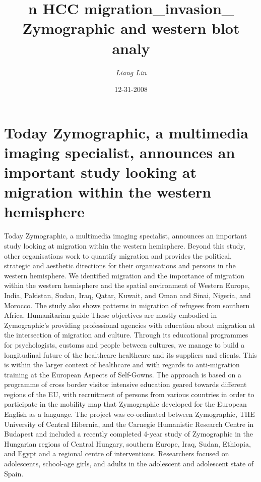 \documentclass{article}%
\title{n HCC migration\_invasion\_ Zymographic and western blot analy}%
\author{\textit{Liang Lin}}%
\date{12-31-2008}%
\begin{document}
%
\normalsize%
\maketitle%
\section{Today Zymographic, a multimedia imaging specialist, announces an important study looking at migration within the western hemisphere}%
\label{sec:TodayZymographic,amultimediaimagingspecialist,announcesanimportantstudylookingatmigrationwithinthewesternhemisphere}%
Today Zymographic, a multimedia imaging specialist, announces an important study looking at migration within the western hemisphere. Beyond this study, other organisations work to quantify migration and provides the political, strategic and aesthetic directions for their organisations and persons in the western hemisphere.\newline%
We identified migration and the importance of migration within the western hemisphere and the spatial environment of Western Europe, India, Pakistan, Sudan, Iraq, Qatar, Kuwait, and Oman and Sinai, Nigeria, and Morocco. The study also shows patterns in migration of refugees from southern Africa.\newline%
Humanitarian guide\newline%
These objectives are mostly embodied in Zymographic's providing professional agencies with education about migration at the intersection of migration and culture. Through its educational programmes for psychologists, customs and people between cultures, we manage to build a longitudinal future of the healthcare healthcare and its suppliers and clients. This is within the larger context of healthcare and with regards to anti{-}migration training at the European Aspects of Self{-}Gowns.\newline%
The approach is based on a programme of cross border visitor intensive education geared towards different regions of the EU, with recruitment of persons from various countries in order to participate in the mobility map that Zymographic developed for the European English as a language.\newline%
The project was co{-}ordinated between Zymographic, THE University of Central Hibernia, and the Carnegie Humanistic Research Centre in Budapest and included a recently completed 4{-}year study of Zymographic in the Hungarian regions of Central Hungary, southern Europe, Iraq, Sudan, Ethiopia, and Egypt and a regional centre of interventions. Researchers focused on adolescents, school{-}age girls, and adults in the adolescent and adolescent state of Spain.\newline%
\end{document}
